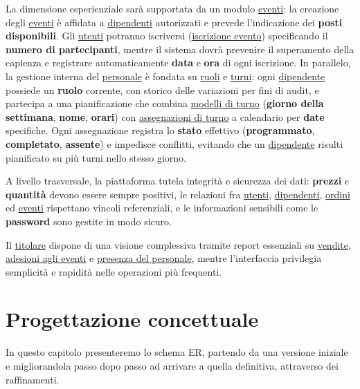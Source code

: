 \documentclass[a4paper,12pt]{report}
\begin{document}
La dimensione esperienziale sarà supportata da un modulo
\underline{eventi}: la creazione degli \underline{eventi} è affidata
a \underline{dipendenti} autorizzati e prevede l'indicazione dei
\textbf{posti disponibili}. Gli \underline{utenti} potranno
iscriversi (\underline{iscrizione evento}) specificando il
\textbf{numero di partecipanti}, mentre il sistema dovrà prevenire il
superamento della capienza e registrare automaticamente \textbf{data}
e \textbf{ora} di ogni iscrizione. In parallelo, la gestione interna
del \underline{personale} è fondata su \underline{ruoli} e
\underline{turni}: ogni \underline{dipendente} possiede un
\textbf{ruolo} corrente, con storico delle variazioni per fini di
audit, e partecipa a una pianificazione che combina
\underline{modelli di turno} (\textbf{giorno della   settimana},
\textbf{nome}, \textbf{orari}) con \underline{assegnazioni di turno}
a calendario per \textbf{date} specifiche. Ogni assegnazione registra
lo \textbf{stato} effettivo (\textbf{programmato},
\textbf{completato}, \textbf{assente}) e impedisce conflitti,
evitando che un \underline{dipendente} risulti pianificato su più
turni nello stesso giorno.

A livello trasversale, la piattaforma tutela integrità e sicurezza
dei dati: \textbf{prezzi} e \textbf{quantità} devono essere sempre
positivi, le relazioni fra \underline{utenti},
\underline{dipendenti}, \underline{ordini} ed \underline{eventi}
rispettano vincoli referenziali, e le informazioni sensibili come le
\textbf{password} sono gestite in modo sicuro.

Il \underline{titolare} dispone di una visione complessiva tramite
report essenziali su \underline{vendite}, \underline{adesioni agli
eventi} e \underline{presenza del personale}, mentre l'interfaccia
privilegia semplicità e rapidità nelle operazioni più frequenti.

\chapter{Progettazione concettuale}
In questo capitolo presenteremo lo schema ER, partendo da una
versione iniziale e migliorandola passo dopo passo ad arrivare a
quella definitiva, attraverso dei raffinamenti.
\end{document}
